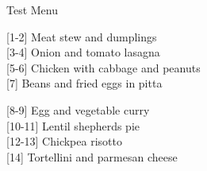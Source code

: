 
    
		\begin{menu}{Test Menu}
    
    \begin{recipelist}
    
        {\scriptsize[1-2]} Meat stew and dumplings\\
        {\scriptsize[3-4]} Onion and tomato lasagna\\
        {\scriptsize[5-6]} Chicken with cabbage and peanuts\\
        {\scriptsize[7]} Beans and fried eggs in pitta\\%
    \end{recipelist}%
    \begin{recipelist}
    
        {\scriptsize[8-9]} Egg and vegetable curry\\
        {\scriptsize[10-11]} Lentil shepherds pie\\
        {\scriptsize[12-13]} Chickpea risotto\\
        {\scriptsize[14]} Tortellini and parmesan cheese\\%
    \end{recipelist}\par%
  

\end{menu}
